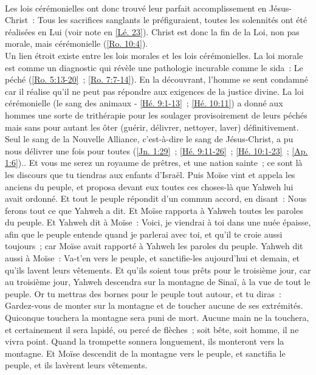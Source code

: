 \begin{multicols}{2}
{\\Les lois cérémonielles ont donc trouvé leur parfait accomplissement en Jésus-Christ~: Tous les sacrifices sanglants le préfiguraient, toutes les solennités ont été réalisées en Lui (voir note en \vref{Lé. 23}). Christ est donc la fin de la Loi, non pas morale, mais cérémonielle (\vref{Ro. 10:4}).
\\Un lien étroit existe entre les lois morales et les lois cérémonielles. La loi morale est comme un diagnostic qui révèle une pathologie incurable comme le sida~: Le péché (\vref{Ro. 5:13-20}~; \vref{Ro. 7:7-14}). En la découvrant, l'homme se sent condamné car il réalise qu'il ne peut pas répondre aux exigences de la justice divine. La loi cérémonielle (le sang des animaux - \vref{Hé. 9:1-13}~; \vref{Hé. 10:11}) a donné aux hommes une sorte de trithérapie pour les soulager provisoirement de leurs péchés mais sans pour autant les ôter (guérir, délivrer, nettoyer, laver) définitivement. Seul le sang de la Nouvelle Alliance, c'est-à-dire le sang de Jésus-Christ, a pu nous délivrer une fois pour toutes (\vref{Jn. 1:29}~; \vref{Hé. 9:11-26}~; \vref{Hé. 10:1-23}~; \vref{Ap. 1:6}).}.
Et vous me serez un royaume de prêtres, et une nation sainte~; ce sont là les discours que tu tiendras aux enfants d'Israël.
Puis Moïse vint et appela les anciens du peuple, et proposa devant eux toutes ces choses-là que Yahweh lui avait ordonné.
Et tout le peuple répondit d'un commun accord, en disant~: Nous ferons tout ce que Yahweh a dit. Et Moïse rapporta à Yahweh toutes les paroles du peuple.
Et Yahweh dit à Moïse~: Voici, je viendrai à toi dans une nuée épaisse, afin que le peuple entende quand je parlerai avec toi, et qu'il te croie aussi toujours~; car Moïse avait rapporté à Yahweh les paroles du peuple.
Yahweh dit aussi à Moïse~: Va-t'en vers le peuple, et sanctifie-les aujourd'hui et demain, et qu'ils lavent leurs vêtements.
Et qu'ils soient tous prêts pour le troisième jour, car au troisième jour, Yahweh descendra sur la montagne de Sinaï, à la vue de tout le peuple.
Or tu mettras des bornes pour le peuple tout autour, et tu diras~: Gardez-vous de monter sur la montagne et de toucher aucune de ses extrémités. Quiconque touchera la montagne sera puni de mort.
Aucune main ne la touchera, et certainement il sera lapidé, ou percé de flèches~; soit bête, soit homme, il ne vivra point. Quand la trompette sonnera longuement, ils monteront vers la montagne.
Et Moïse descendit de la montagne vers le peuple, et sanctifia le peuple, et ils lavèrent leurs vêtements.

\end{multicols}
